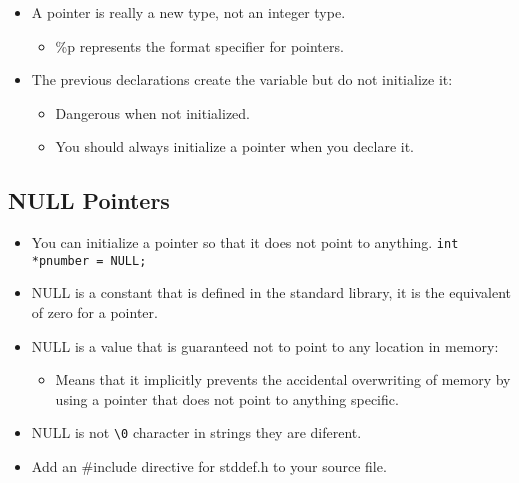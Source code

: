 \begin{itemize}
    \item A pointer is really a new type, not an integer type. 
        \begin{itemize}
            \item \%p represents the format specifier for pointers.
        \end{itemize}
    
    \item The previous declarations create the variable but do not initialize it: 
        \begin{itemize}
            \item Dangerous when not initialized. 
            \item You should always initialize a pointer when you declare it. 
        \end{itemize}
\end{itemize}
\subsection{NULL Pointers}
\begin{itemize}
    \item You can initialize a pointer so that it does not point to anything. \verb|int *pnumber = NULL;|
    \item NULL is a constant that is defined in the standard library, it is the equivalent of zero for a pointer. 
    \item NULL is a value that is guaranteed not to point to any location in memory:
        \begin{itemize}
            \item Means that it implicitly prevents the accidental overwriting of memory by using a pointer that does not point to anything specific. 
        \end{itemize}
    
    \item NULL is not \verb|\0| character in strings they are diferent. 
    \item Add an \#include directive for stddef.h to your source file. 
\end{itemize}
